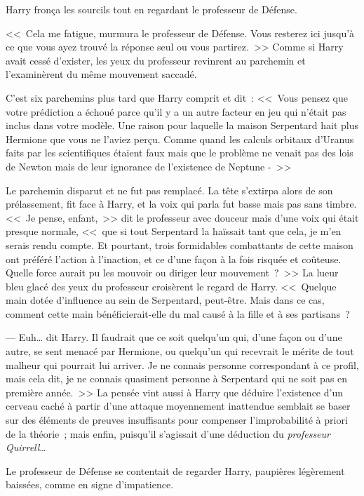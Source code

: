 Harry fronça les sourcils tout en regardant le professeur de Défense.

<<~Cela me fatigue, murmura le professeur de Défense. Vous resterez ici jusqu'à ce que vous ayez trouvé la réponse seul ou vous partirez.~>> Comme si Harry avait cessé d'exister, les yeux du professeur revinrent au parchemin et l'examinèrent du même mouvement saccadé.

C'est six parchemins plus tard que Harry comprit et dit~: <<~Vous pensez que votre prédiction a échoué parce qu'il y a un autre facteur en jeu qui n'était pas inclus dans votre modèle. Une raison pour laquelle la maison Serpentard hait plus Hermione que vous ne l'aviez perçu. Comme quand les calculs orbitaux d'Uranus faits par les scientifiques étaient faux mais que le problème ne venait pas des lois de Newton mais de leur ignorance de l'existence de Neptune -~>>

Le parchemin disparut et ne fut pas remplacé. La tête s'extirpa alors de son prélassement, fit face à Harry, et la voix qui parla fut basse mais pas sans timbre. <<~Je pense, enfant,~>> dit le professeur avec douceur mais d'une voix qui était presque normale, <<~que si tout Serpentard la haïssait tant que cela, je m'en serais rendu compte. Et pourtant, trois formidables combattants de cette maison ont préféré l'action à l'inaction, et ce d'une façon à la fois risquée et coûteuse. Quelle force aurait pu les mouvoir ou diriger leur mouvement~?~>> La lueur bleu glacé des yeux du professeur croisèrent le regard de Harry. <<~Quelque main dotée d'influence au sein de Serpentard, peut-être. Mais dans ce cas, comment cette main bénéficierait-elle du mal causé à la fille et à ses partisans~?

--- Euh… dit Harry. Il faudrait que ce soit quelqu'un qui, d'une façon ou d'une autre, se sent menacé par Hermione, ou quelqu'un qui recevrait le mérite de tout malheur qui pourrait lui arriver. Je ne connais personne correspondant à ce profil, mais cela dit, je ne connais quasiment personne à Serpentard qui ne soit pas en première année.~>> La pensée vint aussi à Harry que déduire l'existence d'un cerveau caché à partir d'une attaque moyennement inattendue semblait se baser sur des éléments de preuves insuffisants pour compenser l'improbabilité à priori de la théorie~; mais enfin, puisqu'il s'agissait d'une déduction du \emph{professeur Quirrell}…

Le professeur de Défense se contentait de regarder Harry, paupières légèrement baissées, comme en signe d'impatience.

